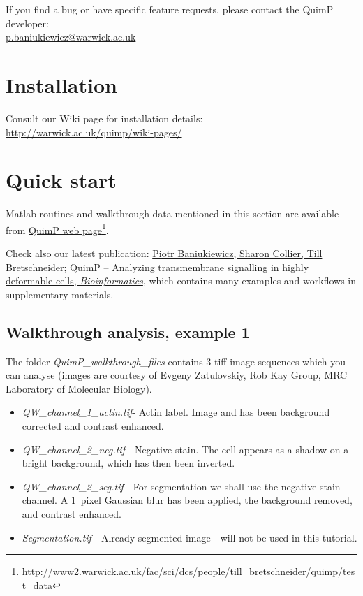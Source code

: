 \documentclass[a4paper,12pt]{article}
\begin{document}
If you find a bug or have specific feature requests, please contact the QuimP developer:\\ \href{mailto:p.baniukiewicz@warwick.ac.uk}{p.baniukiewicz@warwick.ac.uk}

\section{Installation}

Consult our Wiki page for installation details:\\ \url{http://warwick.ac.uk/quimp/wiki-pages/}

\section{Quick start}
Matlab routines and walkthrough data mentioned in this section are available from
\href{http://www2.warwick.ac.uk/fac/sci/dcs/people/till_bretschneider/quimp/test_data}{QuimP web page}\footnote{http://www2.warwick.ac.uk/fac/sci/dcs/people/till\_bretschneider/quimp/test\_data}.

Check also our latest publication: \href{https://doi.org/10.1093/bioinformatics/bty169}{Piotr Baniukiewicz, Sharon Collier, Till Bretschneider; QuimP – Analyzing transmembrane signalling in highly deformable cells, \textit{Bioinformatics}}, which contains many examples and workflows in supplementary materials. 

\subsection{Walkthrough analysis, example 1}
\label{walkthrough}

The folder \emph{QuimP\_walkthrough\_files} contains 3 tiff image sequences which you can
analyse (images are courtesy of Evgeny Zatulovskiy, Rob Kay Group, MRC Laboratory of Molecular Biology).

\begin{itemize}
	\item \textit{QW\_channel\_1\_actin.tif}- Actin label.  Image and has been background corrected and contrast enhanced.
	\item \textit{QW\_channel\_2\_neg.tif} - Negative stain.  The cell appears as a shadow on a bright
	background, which has then been inverted.
	\item \textit{QW\_channel\_2\_seg.tif} - For segmentation we shall use the negative stain channel.  
	A 1~pixel Gaussian blur has been applied, the background removed, and contrast enhanced.  
	\item \textit{Segmentation.tif} - Already segmented image - will not be used in this tutorial.
\end{itemize}
\end{document}
